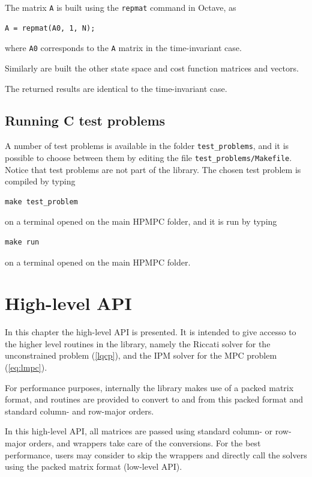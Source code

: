 \documentclass[a4paper]{report}
\begin{document}
The matrix {\tt A} is built using the {\tt repmat} command in Octave, as
\begin{verbatim}
A = repmat(A0, 1, N);
\end{verbatim}
where {\tt A0} corresponds to the {\tt A} matrix in the time-invariant case.

Similarly are built the other state space and cost function matrices and vectors.

The returned results are identical to the time-invariant case.


\section{Running C test problems}

A number of test problems is available in the folder {\tt test\_problems}, and it is possible to choose between them by editing the file {\tt test\_problems/Makefile}.
Notice that test problems are not part of the library.
The chosen test problem is compiled by typing
\begin{verbatim}
make test_problem
\end{verbatim}
on a terminal opened on the main HPMPC folder, and it is run by typing
\begin{verbatim}
make run 
\end{verbatim}
on a terminal opened on the main HPMPC folder.



\chapter{High-level API}

In this chapter the high-level API is presented. 
It is intended to give accesso to the higher level routines in the library, namely the Riccati solver for the unconstrained problem (\ref{lqcp}), and the IPM solver for the MPC problem (\ref{eq:lmpc}).

For performance purposes, internally the library makes use of a packed matrix format, and routines are provided to convert to and from this packed format and standard column- and row-major orders.

In this high-level API, all matrices are passed using standard column- or row-major orders, and wrappers take care of the conversions.
For the best performance, users may consider to skip the wrappers and directly call the solvers using the packed matrix format (low-level API).
\end{document}
